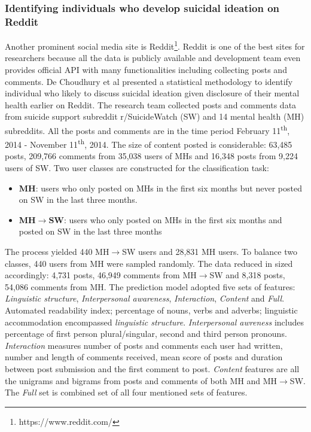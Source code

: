\subsubsection*{Identifying individuals who develop suicidal ideation on Reddit}
Another prominent social media site is Reddit\footnote{https://www.reddit.com/}. Reddit is one of the best sites for researchers because all the data is publicly available and development team even provides official API with many functionalities including collecting posts and comments. De Choudhury et al \cite{DeChoudhury2016} presented a statistical methodology to identify individual who likely to discuss suicidal ideation given disclosure of their mental health earlier on Reddit. The research team collected posts and comments data from suicide support subreddit r/SuicideWatch (SW) and 14 mental health (MH) subreddits. All the posts and comments are in the time period February 11\textsuperscript{th}, 2014 - November 11\textsuperscript{th}, 2014. The size of content posted is considerable: 63,485 posts, 209,766 comments from 35,038 users of MHs and 16,348 posts from 9,224 users of SW. Two user classes are constructed for the classification task:
\begin{itemize}
\item \textbf{MH}: users who only posted on MHs in the first six months but never posted on SW in the last three months. 
\item \textbf{MH$\rightarrow$SW}: users who only posted on MHs in the first six months and posted on SW in the last three months
\end{itemize}
The process yielded 440 MH$\rightarrow$SW users and 28,831 MH users. To balance two classes, 440 users from MH were sampled randomly. The data reduced in sized accordingly: 4,731 posts, 46,949 comments from MH$\rightarrow$SW and 8,318 posts, 54,086 comments from MH. The prediction model adopted five sets of features: \textit{Linguistic structure}, \textit{Interpersonal awareness}, \textit{Interaction}, \textit{Content} and \textit{Full}. Automated readability index; percentage of nouns, verbs and adverbs; linguistic accommodation encompassed \textit{linguistic structure}. \textit{Interpersonal awreness} includes percentage of first person plural/singular, second and third person pronouns. \textit{Interaction} measures number of posts and comments each user had written, number and length of comments received, mean score of posts and duration between post submission and the first comment to post. \textit{Content} features are all the unigrams and bigrams from posts and comments of both MH and MH$\rightarrow$SW. The \textit{Full} set is combined set of all four mentioned sets of features.\\
